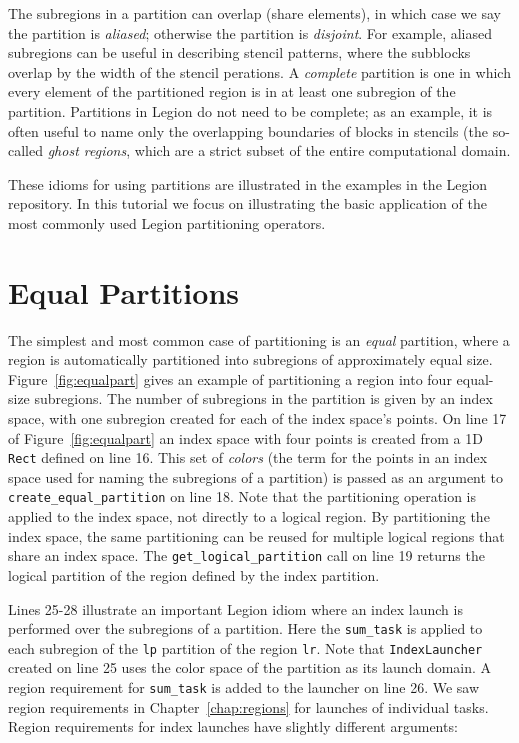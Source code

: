 The subregions in a partition can overlap (share elements), in which
case we say the partition is {\em aliased}; otherwise the partition is
{\em disjoint}.  For example, aliased subregions can be useful in
describing stencil patterns, where the subblocks overlap by the width
of the stencil perations.  A {\em complete} partition is one in which
every element of the partitioned region is in at least one subregion
of the partition.  Partitions in Legion do not need to be complete; as an example,
it is often useful to name only the overlapping boundaries of blocks in stencils (the so-called {\em ghost regions}, which are a strict subset of the entire computational domain.

These idioms for using partitions are illustrated in the examples in the Legion repository.  In this tutorial we focus on illustrating the basic application of
the most commonly used Legion partitioning operators.

\section{Equal Partitions}
\label{sec:equal}

The simplest and most common case of partitioning is an {\em equal}
partition, where a region is automatically partitioned into subregions
of approximately equal size.  Figure~\ref{fig:equalpart} gives an
example of partitioning a region into four equal-size subregions.  The
number of subregions in the partition is given by an index space, with
one subregion created for each of the index space's points.  On line
17 of Figure~\ref{fig:equalpart} an index space with four points is
created from a 1D {\tt Rect} defined on line 16.  This set of {\em
  colors} (the term for the points in an index space
used for naming the subregions of a partition) is passed as an
argument to {\tt create\_equal\_partition} on line 18.  Note that the
partitioning operation is applied to the index space, not directly to
a logical region.  By partitioning the index space, the same
partitioning can be reused for multiple logical regions that share an
index space.  The {\tt get\_logical\_partition} call on line 19
returns the logical partition of the region defined by the index
partition.

Lines 25-28 illustrate an important Legion idiom where an index launch is performed
over the subregions of a partition.  Here the {\tt sum\_task} is applied to each
subregion of the {\tt lp} partition of the region {\tt lr}.   Note that {\tt IndexLauncher} created on line 25 uses the color space of the partition as its launch domain.  A region requirement for {\tt sum\_task} is added to the launcher on line 26.
We saw region requirements in Chapter~\ref{chap:regions} for launches of individual
tasks.  Region requirements for index launches have slightly different arguments:

